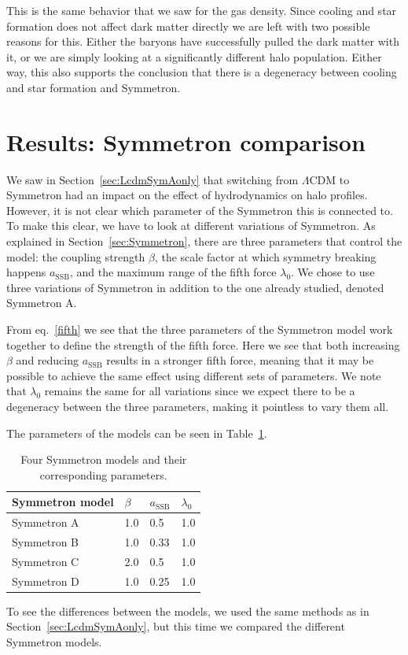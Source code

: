 \documentclass{aa}
\newcommand{\symmA}{Symmetron A}
\begin{document}
This is the same behavior that we saw for the gas density. Since cooling and star formation does not affect dark matter directly we are left with two possible reasons for this. Either the baryons have successfully pulled the dark matter with it, or we are simply looking at a significantly different halo population. Either way, this also supports the conclusion that there is a degeneracy between cooling and star formation and Symmetron.

\section{Results: Symmetron comparison}\label{sec:symmcomp}
We saw in Section~\ref{sec:LcdmSymAonly} that switching from $\Lambda$CDM to Symmetron had an impact on the effect of hydrodynamics on halo profiles. However, it is not clear which parameter of the Symmetron this is connected to. To make this clear, we have to look at different variations of Symmetron.
As explained in Section~\ref{sec:Symmetron}, there are three parameters that control the model:  the coupling strength $\beta$, the scale factor at which symmetry breaking happens $a_{\mathrm{SSB}}$, and the maximum range of the fifth force $\lambda_0$. We  chose to use three variations of Symmetron in addition to the one already studied, denoted \symmA. 

From eq.~\ref{fifth} we see that the three parameters of the Symmetron model work together to define the strength of the fifth force. Here we see that both increasing $\beta$ and reducing $a_{\mathrm{SSB}}$ results in a stronger fifth force, meaning that it may be possible to achieve the same effect using different sets of parameters. We note that $\lambda_0$ remains the same for all variations since we expect there to be a degeneracy between the three parameters, making it pointless to vary them all.

The parameters of the models can be seen in Table~\ref{tab:model_params}. 
\begin{table}
        \centering
        \caption{Four Symmetron models and their corresponding parameters.}
        \label{tab:model_params}
        \begin{tabular}{l l l l}
        \hline
        Symmetron model & $\beta$ & $a_{\mathrm{SSB}}$ & $\lambda_0$\\
        \hline 
        Symmetron A & 1.0 & 0.5  & 1.0\\
        Symmetron B & 1.0 & 0.33 & 1.0\\
        Symmetron C & 2.0 & 0.5  & 1.0\\
        Symmetron D & 1.0 & 0.25 & 1.0\\
        \hline
        \end{tabular}
\end{table}
To see the differences between the models, we used the same methods as in Section~\ref{sec:LcdmSymAonly}, but this time we compared the different Symmetron models. 
\end{document}
